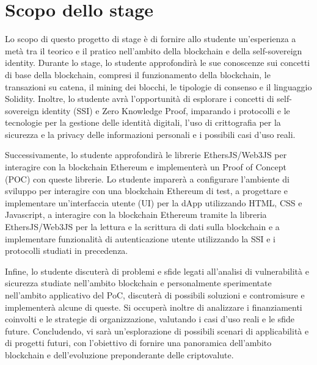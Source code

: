 \section*{Scopo dello stage}

Lo scopo di questo progetto di stage è di fornire allo studente un'esperienza a metà tra il teorico e il pratico nell'ambito della blockchain e della self-sovereign identity.
Durante lo stage, lo studente approfondirà le sue conoscenze sui concetti di base della blockchain, compresi il funzionamento della blockchain, 
le transazioni su catena, il mining dei blocchi, le tipologie di consenso e il linguaggio Solidity. Inoltre, lo studente avrà l'opportunità di
esplorare i concetti di self-sovereign identity (SSI) e Zero Knowledge Proof, imparando i protocolli e le tecnologie per la gestione delle identità digitali,
l'uso di crittografia per la sicurezza e la privacy delle informazioni personali e i possibili casi d'uso reali.

\medskip 

Successivamente, lo studente approfondirà le librerie EthersJS/Web3JS per interagire con la blockchain Ethereum e implementerà un Proof of Concept (POC) 
con queste librerie. Lo studente imparerà a configurare l'ambiente di sviluppo per interagire con una 
blockchain Ethereum di test, a progettare e implementare un'interfaccia utente (UI) per la dApp utilizzando HTML, 
CSS e Javascript, a interagire con la blockchain Ethereum tramite la libreria EthersJS/Web3JS 
per la lettura e la scrittura di dati sulla blockchain e a implementare funzionalità di autenticazione utente 
utilizzando la SSI e i protocolli studiati in precedenza.

\medskip

Infine, lo studente discuterà di problemi e sfide legati all'analisi di vulnerabilità e sicurezza studiate nell'ambito blockchain e personalmente
sperimentate nell'ambito applicativo del PoC, discuterà di possibili soluzioni e contromisure e implementerà alcune di queste.
Si occuperà inoltre di analizzare i finanziamenti coinvolti e le strategie di organizzazione, valutando i casi d'uso reali e le sfide future.
Concludendo, vi sarà un'esplorazione di possibili scenari di applicabilità e di progetti futuri, con l'obiettivo di fornire una panoramica
dell'ambito blockchain e dell'evoluzione preponderante delle criptovalute. 

\newpage


